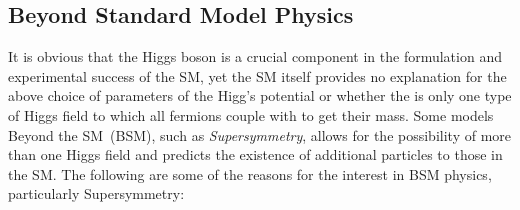 \clearpage

\subsection{Beyond Standard Model Physics}
It is obvious that the Higgs boson is a crucial component in the  formulation and experimental success of the SM, yet the SM itself provides no explanation for the above choice of parameters of the Higg's potential or whether the is only one type of Higgs field to which all fermions couple with to get  their mass. Some models Beyond the SM~(BSM), such as \textit{Supersymmetry}, allows for the possibility of more than one Higgs field and predicts the existence of additional particles to those in the SM. The following are some of the reasons for the interest in BSM physics, particularly Supersymmetry:
